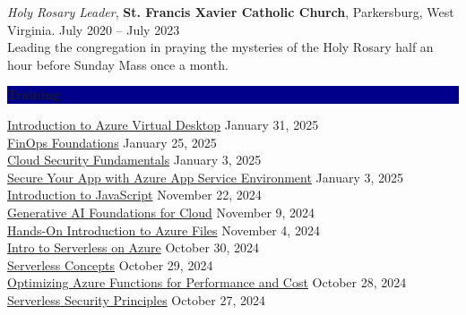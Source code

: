 \documentclass[10pt]{res} %
\begin{document}
\begin{resume}

\vspace{0.025in}

\colorbox{darkblue}{}

{\sl Holy Rosary Leader}, {\bf St. Francis Xavier Catholic Church}, Parkersburg, West Virginia. \hfill July 2020 -- July 2023 \\
Leading the congregation in praying the mysteries of the Holy Rosary half an hour before Sunday Mass once a month.


\colorbox{darkblue}{\color{white}\centerline{\bf Training}}
\colorbox{acloudguru}{}

\href{https://verify.acloud.guru/B93CD36DD656}{\color{blue}Introduction to Azure Virtual Desktop} \hfill January 31, 2025 \\
\href{https://verify.acloud.guru/27219340D7FC}{\color{blue}FinOps Foundations} \hfill January 25, 2025 \\
\href{https://verify.acloud.guru/F62897083ED3}{\color{blue}Cloud Security Fundamentals} \hfill January 3, 2025 \\
\href{https://verify.acloud.guru/0C8A8508D289}{\color{blue}Secure Your App with Azure App Service Environment} \hfill January 3, 2025 \\
\href{https://verify.acloud.guru/2FA5314FBCF0}{\color{blue}Introduction to JavaScript} \hfill November 22, 2024 \\
\href{https://verify.acloud.guru/A1AC1A6663DD}{\color{blue}Generative AI Foundations for Cloud} \hfill November 9, 2024 \\
\href{https://verify.acloud.guru/B66EA6D1E890}{\color{blue}Hands-On Introduction to Azure Files} \hfill November 4, 2024 \\
\href{https://verify.acloud.guru/6F1A1672BD43}{\color{blue}Intro to Serverless on Azure} \hfill October 30, 2024 \\
\href{https://verify.acloud.guru/7AF2F02135FF}{\color{blue}Serverless Concepts} \hfill October 29, 2024 \\
\href{https://verify.acloud.guru/F5FD5B173297}{\color{blue}Optimizing Azure Functions for Performance and Cost} \hfill October 28, 2024 \\
\href{https://verify.acloud.guru/82A4B2A23F31}{\color{blue}Serverless Security Principles} \hfill October 27, 2024


\end{resume}
\end{document}
